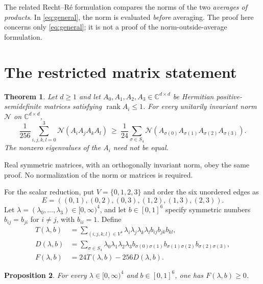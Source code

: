 \documentclass[11pt,letterpaper]{article}
\newtheorem{theorem}{Theorem}
\newtheorem{proposition}[theorem]{Proposition}
\newcommand{\N}{\mathcal N}
\newcommand{\C}{\mathbb C}
\newcommand{\rank}{\operatorname{rank}}
\begin{document}
The related Recht--R\'e formulation \cite{rr} compares the norms of the two \emph{averages of products}. In \eqref{eq:general}, the norm is evaluated \emph{before} averaging. The proof here concerns only \eqref{eq:general}; it is not a proof of the norm-outside-average formulation.

\section{The restricted matrix statement}
\begin{theorem}\label{thm:matrix}
Let $d\ge1$ and let $A_0,A_1,A_2,A_3\in\C^{d\times d}$ be Hermitian positive-semidefinite matrices satisfying $\rank A_i\le1$. For every unitarily invariant norm $\N$ on $\C^{d\times d}$,
\begin{equation}\label{eq:matrix}
\frac1{256}\sum_{i,j,k,l=0}^3\N(A_iA_jA_kA_l)
\ \ge\ \frac1{24}\sum_{\sigma\in S_4}
\N(A_{\sigma(0)}A_{\sigma(1)}A_{\sigma(2)}A_{\sigma(3)}).
\end{equation}
The nonzero eigenvalues of the $A_i$ need not be equal.
\end{theorem}

Real symmetric matrices, with an orthogonally invariant norm, obey the same proof. No normalization of the norm or matrices is required.

For the scalar reduction, put $V=\{0,1,2,3\}$ and order the six unordered edges as
\begin{equation}\label{eq:edges}
E=((0,1),(0,2),(0,3),(1,2),(1,3),(2,3)).
\end{equation}
Let $\lambda=(\lambda_0,\ldots,\lambda_3)\in[0,\infty)^4$, and let $b\in[0,1]^6$ specify symmetric numbers $b_{ij}=b_{ji}$ for $i\ne j$, with $b_{ii}=1$. Define
\begin{align}
T(\lambda,b)&=\sum_{(i,j,k,l)\in V^4}
 \lambda_i\lambda_j\lambda_k\lambda_l b_{ij}b_{jk}b_{kl},\label{eq:T}\\
D(\lambda,b)&=\sum_{\sigma\in S_4}
 \lambda_0\lambda_1\lambda_2\lambda_3
 b_{\sigma(0)\sigma(1)}b_{\sigma(1)\sigma(2)}b_{\sigma(2)\sigma(3)},\label{eq:D}\\
F(\lambda,b)&=24T(\lambda,b)-256D(\lambda,b).\label{eq:F}
\end{align}

\begin{proposition}\label{prop:scalar}
For every $\lambda\in[0,\infty)^4$ and $b\in[0,1]^6$, one has $F(\lambda,b)\ge0$.
\end{proposition}
\end{document}
